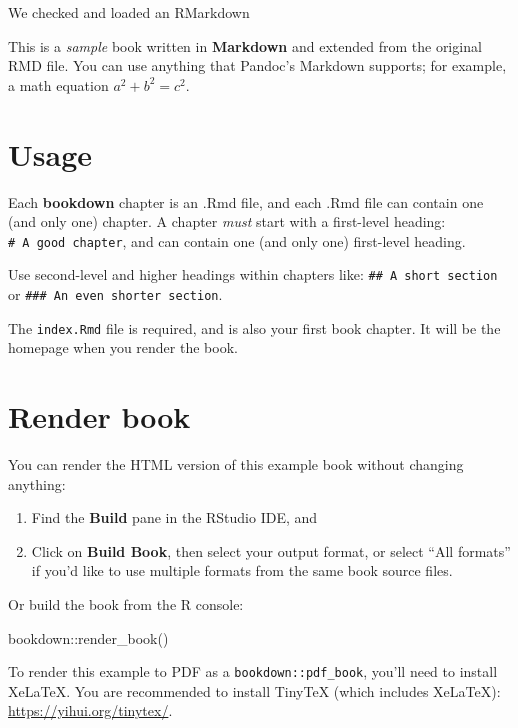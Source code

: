 \documentclass[
]{book}
\newenvironment{Shaded}{\begin{snugshade}}{\end{snugshade}}
\newcommand{\FunctionTok}[1]{\textcolor[rgb]{0.00,0.00,0.00}{#1}}
\newcommand{\NormalTok}[1]{#1}
\newcommand{\SpecialCharTok}[1]{\textcolor[rgb]{0.00,0.00,0.00}{#1}}
\begin{document}
We checked and loaded an RMarkdown

This is a \emph{sample} book written in \textbf{Markdown} and extended from the original RMD file. You can use anything that Pandoc's Markdown supports; for example, a math equation \(a^2 + b^2 = c^2\).

\hypertarget{usage}{%
\section{Usage}\label{usage}}

Each \textbf{bookdown} chapter is an .Rmd file, and each .Rmd file can contain one (and only one) chapter. A chapter \emph{must} start with a first-level heading: \texttt{\#\ A\ good\ chapter}, and can contain one (and only one) first-level heading.

Use second-level and higher headings within chapters like: \texttt{\#\#\ A\ short\ section} or \texttt{\#\#\#\ An\ even\ shorter\ section}.

The \texttt{index.Rmd} file is required, and is also your first book chapter. It will be the homepage when you render the book.

\hypertarget{render-book}{%
\section{Render book}\label{render-book}}

You can render the HTML version of this example book without changing anything:

\begin{enumerate}
\def\labelenumi{\arabic{enumi}.}
\item
  Find the \textbf{Build} pane in the RStudio IDE, and
\item
  Click on \textbf{Build Book}, then select your output format, or select ``All formats'' if you'd like to use multiple formats from the same book source files.
\end{enumerate}

Or build the book from the R console:

\begin{Shaded}
\begin{Highlighting}[]
\NormalTok{bookdown}\SpecialCharTok{::}\FunctionTok{render\_book}\NormalTok{()}
\end{Highlighting}
\end{Shaded}

To render this example to PDF as a \texttt{bookdown::pdf\_book}, you'll need to install XeLaTeX. You are recommended to install TinyTeX (which includes XeLaTeX): \url{https://yihui.org/tinytex/}.
\end{document}
